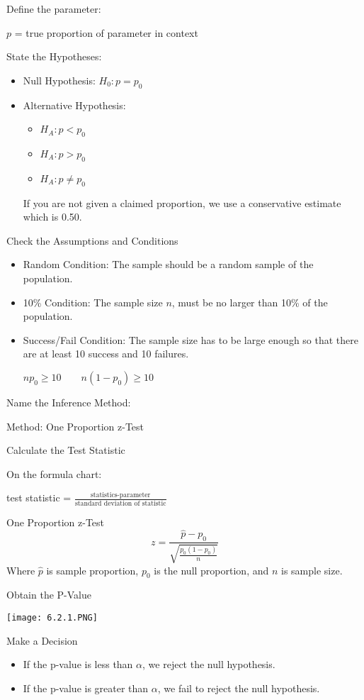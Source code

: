 \documentclass[../stats.tex]{subfiles}
\begin{document}
Define the parameter:

$p$ = true proportion of {parameter in context}

State the Hypotheses: 
\begin{itemize}
    \item Null Hypothesis: $H_0: p=p_0$
    \item Alternative Hypothesis:
    \begin{itemize}
        \item $H_A: p<p_0$
        \item $H_A: p>p_0$
        \item $H_A: p\neq p_0$
    \end{itemize}
    If you are not given a claimed proportion, we use a conservative estimate which is 0.50.
\end{itemize}

Check the Assumptions and Conditions 
\begin{itemize}
    \item Random Condition: The sample should be a random sample of the population.
    \item 10\% Condition: The sample size $n$, must be no larger than 10\% of the population.
    \item Success/Fail Condition: The sample size has to be large enough so that there are at least 10 success and 10 failures.
    \begin{center}
        $np_0 \geq 10 \qquad n(1-p_0)\geq 10$
    \end{center}
\end{itemize}

Name the Inference Method: 

Method: One Proportion z-Test 

Calculate the Test Statistic

On the formula chart:
\begin{center}
    test statistic = $\frac{\text{statistics-parameter}}{\text{standard deviation of statistic}}$
\end{center}

One Proportion z-Test
\[ z = \frac{\hat{p}-p_0}{\sqrt{\frac{p_0(1-p_0)}{n}}} \]
Where $\hat{p}$ is sample proportion, $p_0$ is the null proportion, and $n$ is sample size.

Obtain the P-Value 
\begin{center}
    \texttt{[image: 6.2.1.PNG]}
\end{center}

Make a Decision 
\begin{itemize}
    \item If the p-value is less than $\alpha$, we reject the null hypothesis.
    \item If the p-value is greater than $\alpha$, we fail to reject the null hypothesis.
\end{itemize}
\end{document}
